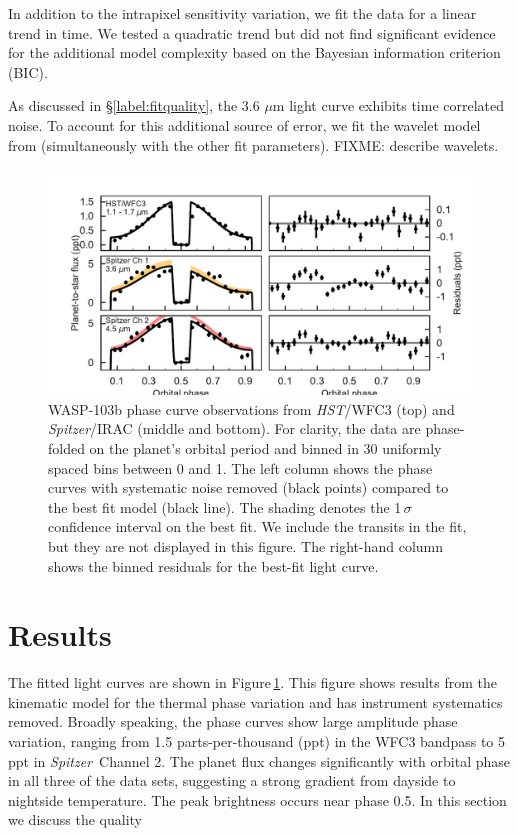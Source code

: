 \documentclass[twocolumn]{aastex61}
\newcommand{\project}[1]{\textsl{#1}}
\newcommand{\HST}{\project{HST}}
\newcommand{\Spitzer}{\project{Spitzer}}
\begin{document}
In addition to the intrapixel sensitivity variation, we fit the data for a linear trend in time. We tested a quadratic trend but did not find significant evidence for the additional model complexity based on the Bayesian information criterion (BIC). 

As discussed in \S \ref{label:fitquality}, the 3.6 $\mu$m light curve exhibits time correlated noise. To account for this additional source of error, we fit the wavelet model from \cite{carter09} (simultaneously with the other fit parameters). FIXME: describe wavelets.


\begin{figure}
\includegraphics[width = 1.0\textwidth]{Figures/phase_curves.pdf}
\caption{WASP-103b phase curve observations from \HST/WFC3 (top) and \Spitzer/IRAC (middle and bottom). For clarity, the data are phase-folded on the planet's orbital period and binned in 30 uniformly spaced bins between 0 and 1. The left column shows the phase curves with systematic noise removed (black points) compared to the best fit model (black line). The shading denotes the  1\,$\sigma$ confidence interval on the best fit. We include the transits in the fit, but they are not displayed in this figure. The right-hand column shows the binned residuals for the best-fit light curve.}
\label{fig:phasecurves}
\end{figure}

\section{Results}
The fitted light curves are shown in Figure\,\ref{fig:phasecurves}. This figure shows results from the kinematic model for the thermal phase variation and has instrument systematics removed.  Broadly speaking, the phase curves show large amplitude phase variation, ranging from 1.5 parts-per-thousand (ppt) in the WFC3 bandpass to 5 ppt in \Spitzer\ Channel 2.  The planet flux changes significantly with orbital phase in all three of the data sets, suggesting a strong gradient from dayside to nightside temperature. The peak brightness occurs near phase 0.5.
In this section we discuss the quality 
\end{document}
